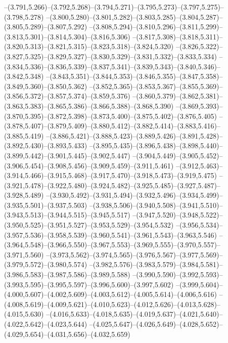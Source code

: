  --(3.791,5.266)--(3.792,5.268)--(3.794,5.271)--(3.795,5.273)--(3.797,5.275)--(3.798,5.278)%
  --(3.800,5.280)--(3.801,5.282)--(3.803,5.285)--(3.804,5.287)--(3.805,5.289)--(3.807,5.292)%
  --(3.808,5.294)--(3.810,5.296)--(3.811,5.299)--(3.813,5.301)--(3.814,5.304)--(3.816,5.306)%
  --(3.817,5.308)--(3.818,5.311)--(3.820,5.313)--(3.821,5.315)--(3.823,5.318)--(3.824,5.320)%
  --(3.826,5.322)--(3.827,5.325)--(3.829,5.327)--(3.830,5.329)--(3.831,5.332)--(3.833,5.334)%
  --(3.834,5.336)--(3.836,5.339)--(3.837,5.341)--(3.839,5.343)--(3.840,5.346)--(3.842,5.348)%
  --(3.843,5.351)--(3.844,5.353)--(3.846,5.355)--(3.847,5.358)--(3.849,5.360)--(3.850,5.362)%
  --(3.852,5.365)--(3.853,5.367)--(3.855,5.369)--(3.856,5.372)--(3.857,5.374)--(3.859,5.376)%
  --(3.860,5.379)--(3.862,5.381)--(3.863,5.383)--(3.865,5.386)--(3.866,5.388)--(3.868,5.390)%
  --(3.869,5.393)--(3.870,5.395)--(3.872,5.398)--(3.873,5.400)--(3.875,5.402)--(3.876,5.405)%
  --(3.878,5.407)--(3.879,5.409)--(3.880,5.412)--(3.882,5.414)--(3.883,5.416)--(3.885,5.419)%
  --(3.886,5.421)--(3.888,5.423)--(3.889,5.426)--(3.891,5.428)--(3.892,5.430)--(3.893,5.433)%
  --(3.895,5.435)--(3.896,5.438)--(3.898,5.440)--(3.899,5.442)--(3.901,5.445)--(3.902,5.447)%
  --(3.904,5.449)--(3.905,5.452)--(3.906,5.454)--(3.908,5.456)--(3.909,5.459)--(3.911,5.461)%
  --(3.912,5.463)--(3.914,5.466)--(3.915,5.468)--(3.917,5.470)--(3.918,5.473)--(3.919,5.475)%
  --(3.921,5.478)--(3.922,5.480)--(3.924,5.482)--(3.925,5.485)--(3.927,5.487)--(3.928,5.489)%
  --(3.930,5.492)--(3.931,5.494)--(3.932,5.496)--(3.934,5.499)--(3.935,5.501)--(3.937,5.503)%
  --(3.938,5.506)--(3.940,5.508)--(3.941,5.510)--(3.943,5.513)--(3.944,5.515)--(3.945,5.517)%
  --(3.947,5.520)--(3.948,5.522)--(3.950,5.525)--(3.951,5.527)--(3.953,5.529)--(3.954,5.532)%
  --(3.956,5.534)--(3.957,5.536)--(3.958,5.539)--(3.960,5.541)--(3.961,5.543)--(3.963,5.546)%
  --(3.964,5.548)--(3.966,5.550)--(3.967,5.553)--(3.969,5.555)--(3.970,5.557)--(3.971,5.560)%
  --(3.973,5.562)--(3.974,5.565)--(3.976,5.567)--(3.977,5.569)--(3.979,5.572)--(3.980,5.574)%
  --(3.982,5.576)--(3.983,5.579)--(3.984,5.581)--(3.986,5.583)--(3.987,5.586)--(3.989,5.588)%
  --(3.990,5.590)--(3.992,5.593)--(3.993,5.595)--(3.995,5.597)--(3.996,5.600)--(3.997,5.602)%
  --(3.999,5.604)--(4.000,5.607)--(4.002,5.609)--(4.003,5.612)--(4.005,5.614)--(4.006,5.616)%
  --(4.008,5.619)--(4.009,5.621)--(4.010,5.623)--(4.012,5.626)--(4.013,5.628)--(4.015,5.630)%
  --(4.016,5.633)--(4.018,5.635)--(4.019,5.637)--(4.021,5.640)--(4.022,5.642)--(4.023,5.644)%
  --(4.025,5.647)--(4.026,5.649)--(4.028,5.652)--(4.029,5.654)--(4.031,5.656)--(4.032,5.659)%
